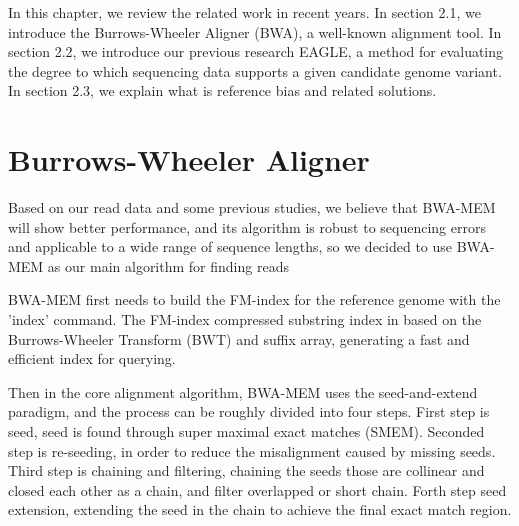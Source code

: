\hspace{24pt}
In this chapter, we review the related work in recent years. In section 2.1, we introduce the Burrows-Wheeler Aligner (BWA), a well-known alignment tool. In section 2.2, we introduce our previous research EAGLE, a method for evaluating the degree to which sequencing data supports a given candidate genome variant. In section 2.3, we explain what is reference bias and related solutions.
\section{Burrows-Wheeler Aligner}
Based on our read data and some previous studies, we believe that BWA-MEM will show better performance\cite{hwang2015systematic}, and its algorithm is robust to sequencing errors and applicable to a wide range of sequence lengths, so we decided to use BWA-MEM as our main algorithm for finding reads

BWA-MEM first needs to build the FM-index \cite{ferragina2005indexing} for the reference genome with the 'index' command.  The FM-index compressed substring index in based on the Burrows-Wheeler Transform (BWT) \cite{burrows1994block} and suffix array, generating a fast and efficient index for querying.

Then in the core alignment algorithm, BWA-MEM uses the seed-and-extend paradigm, and the process can be roughly divided into four steps. First step is seed, seed is found through super maximal exact matches (SMEM). Seconded step is re-seeding, in order to reduce the misalignment caused by missing seeds. Third step is chaining and filtering, chaining the seeds those are collinear and closed each other as a chain, and filter overlapped or short chain. Forth step seed extension, extending the seed in the chain to achieve the final exact match region.
